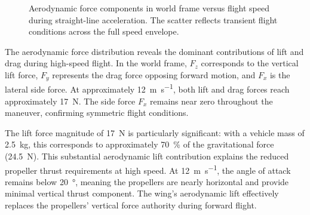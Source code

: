 \begin{figure}[htbp]
  \centering
  \caption{Aerodynamic force components in world frame versus flight speed during straight-line acceleration. The scatter reflects transient flight conditions across the full speed envelope.}
  \label{fig:aero_force_vs_velocity}
\end{figure}

The aerodynamic force distribution reveals the dominant contributions of lift and drag during high-speed flight.
In the world frame, $F_z$ corresponds to the vertical lift force, $F_y$ represents the drag force opposing forward motion, and $F_x$ is the lateral side force.
At approximately \SI{12}{\meter\per\second}, both lift and drag forces reach approximately \SI{17}{\newton}.
The side force $F_x$ remains near zero throughout the maneuver, confirming symmetric flight conditions.

The lift force magnitude of \SI{17}{\newton} is particularly significant: with a vehicle mass of \SI{2.5}{\kilo\gram}, this corresponds to approximately \SI{70}{\percent} of the gravitational force (\SI{24.5}{\newton}).
This substantial aerodynamic lift contribution explains the reduced propeller thrust requirements at high speed.
At \SI{12}{\meter\per\second}, the angle of attack remains below \SI{20}{\degree}, meaning the propellers are nearly horizontal and provide minimal vertical thrust component.
The wing's aerodynamic lift effectively replaces the propellers' vertical force authority during forward flight.

